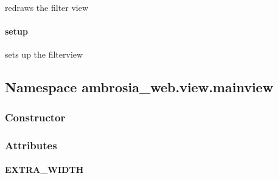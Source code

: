 \documentclass[letterpaper,10pt,english]{sphinxmanual}
\begin{document}
\begin{fulllineitems}
\label{ambrosia_web.view.filterview.FilterView:ambrosia_web.view.filterview.FilterView.redraw}
\end{fulllineitems}


redraws the filter view


\paragraph{setup}
\label{ambrosia_web.view.filterview.FilterView:setup}

\begin{fulllineitems}
\label{ambrosia_web.view.filterview.FilterView:ambrosia_web.view.filterview.FilterView.setup}
\end{fulllineitems}


sets up the filterview


\subsection{Namespace ambrosia\_web.view.mainview}
\label{ambrosia_web.view.mainview::doc}\label{ambrosia_web.view.mainview:namespace-ambrosia-web-view-mainview}

\subsubsection{Constructor}
\label{ambrosia_web.view.mainview:constructor}

\begin{fulllineitems}
\label{ambrosia_web.view.mainview:ambrosia_web.view.mainview}
\end{fulllineitems}



\subsubsection{Attributes}
\label{ambrosia_web.view.mainview:attributes}

\paragraph{EXTRA\_WIDTH}
\label{ambrosia_web.view.mainview:extra-width}
\end{document}
